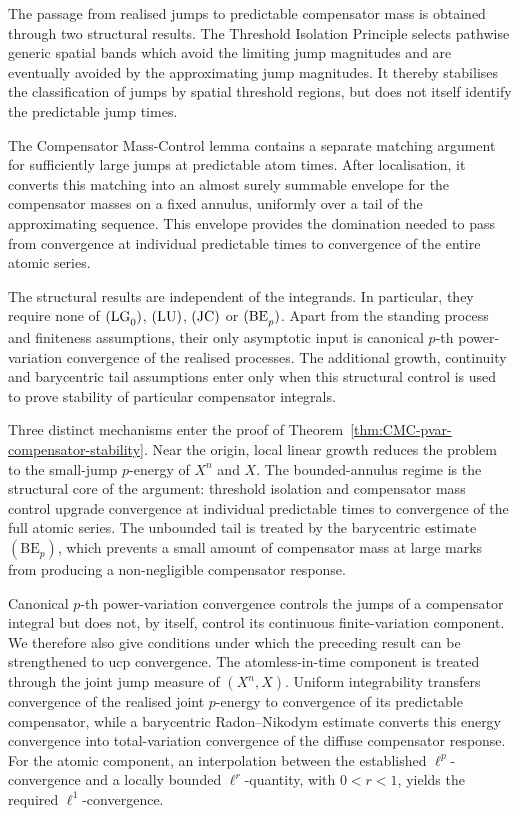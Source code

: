 \documentclass[a4paper,10pt]{article}
\begin{document}
The passage from realised jumps to predictable compensator mass is
obtained through two structural results. The Threshold Isolation
Principle selects pathwise generic spatial bands which avoid the
limiting jump magnitudes and are eventually avoided by the
approximating jump magnitudes. It thereby stabilises the classification
of jumps by spatial threshold regions, but does not itself identify
the predictable jump times.

The Compensator Mass-Control lemma contains a separate matching
argument for sufficiently large jumps at predictable atom times.
After localisation, it converts this matching into an almost surely
summable envelope for the compensator masses on a fixed annulus,
uniformly over a tail of the approximating sequence. This envelope
provides the domination needed to pass from convergence at individual
predictable times to convergence of the entire atomic series.

The structural results are independent of the integrands. In
particular, they require none of \({\rm (LG}_0{\rm )}\),
\({\rm (LU)}\), \({\rm (JC)}\) or
\({\rm (BE}_p{\rm )}\). Apart from the standing process and finiteness
assumptions, their only asymptotic input is canonical \(p\)-th
power-variation convergence of the realised processes. The additional
growth, continuity and barycentric tail assumptions enter only when
this structural control is used to prove stability of particular
compensator integrals.


Three distinct mechanisms enter the proof of
Theorem~\ref{thm:CMC-pvar-compensator-stability}. Near the origin,
local linear growth reduces the problem to the small-jump
\(p\)-energy of \(X^n\) and \(X\). The bounded-annulus regime is the
structural core of the argument: threshold isolation and compensator
mass control upgrade convergence at individual predictable times to
convergence of the full atomic series. The unbounded tail is treated
by the barycentric estimate \((\mathrm{BE}_p)\), which prevents a
small amount of compensator mass at large marks from producing a
non-negligible compensator response.


Canonical \(p\)-th power-variation convergence controls the jumps of a
compensator integral but does not, by itself, control its continuous
finite-variation component. We therefore also give conditions under
which the preceding result can be strengthened to ucp convergence.
The atomless-in-time component is treated through the joint jump
measure of \((X^n,X)\). Uniform integrability transfers convergence of
the realised joint \(p\)-energy to convergence of its predictable
compensator, while a barycentric Radon--Nikodym estimate converts this
energy convergence into total-variation convergence of the diffuse
compensator response. For the atomic component, an interpolation
between the established \(\ell^p\)-convergence and a locally bounded
\(\ell^r\)-quantity, with \(0<r<1\), yields the required
\(\ell^1\)-convergence.
\end{document}
